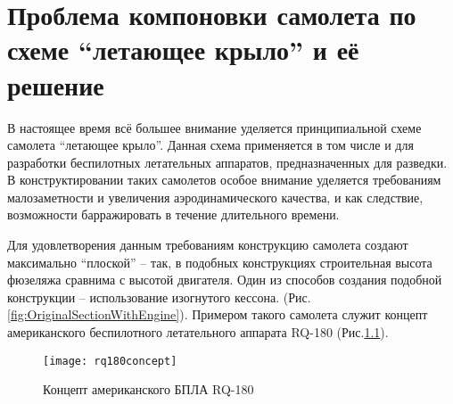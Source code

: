 \chapter{Проблема компоновки самолета по схеме ``летающее крыло'' и её решение}

В настоящее время всё большее внимание уделяется принципиальной схеме самолета ``летающее крыло''. Данная схема применяется в том числе и для разработки беспилотных летательных аппаратов, предназначенных для разведки. В конструктировании таких самолетов особое внимание уделяется требованиям малозаметности и увеличения аэродинамического качества, и как следствие, возможности барражировать в течение длительного времени. 

Для удовлетворения данным требованиям конструкцию самолета создают максимально ``плоской'' -- так, в подобных конструкциях строительная высота фюзеляжа сравнима с высотой двигателя. Один из способов создания подобной конструкции -- использование изогнутого кессона. (Рис.\ref{fig:OriginalSectionWithEngine}). Примером такого самолета служит концепт американского беспилотного летательного аппарата RQ-180 (Рис.\ref{fig:rq180}). 


\begin{figure}[ht]
\centering
\texttt{[image: rq180concept]}
\caption{Концепт американского БПЛА RQ-180 \cite{AvWeekUAV}}
\label{fig:rq180}
\end{figure}






